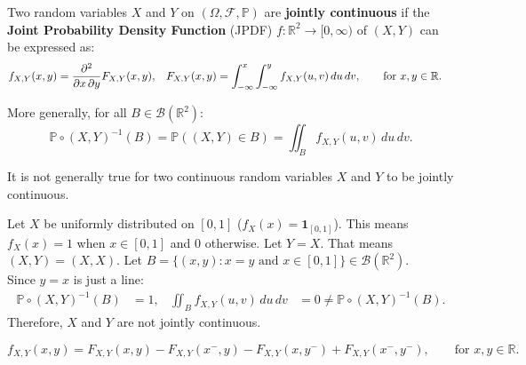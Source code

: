 \documentclass{huhtakm-template-book-v2}
\newcommand{\prob}{\mathbb{P}}
\begin{document}
    \begin{defn}
        Two random variables $X$ and $Y$ on $(\Omega,\mathcal{F},\prob)$ are \textbf{jointly continuous} if the \textbf{Joint Probability Density Function} (JPDF) $f: \mathbb{R}^{2} \to [0,\infty)$ of $(X,Y)$ can be expressed as:
        \begin{align*}
            f_{X,Y}(x, y) &= \pdv*{F_{X,Y}(x, y)}{x,y}, & F_{X,Y}(x, y) &= \int_{-\infty}^{x}\int_{-\infty}^{y}f_{X,Y}(u, v)\,du\,dv, \qquad\text{for }x,y \in \mathbb{R}.
        \end{align*}
    \end{defn}
    \begin{rem}
        More generally, for all $B \in \mathcal{B}(\mathbb{R}^{2})$:
        \begin{equation*}
            \prob \circ (X,Y)^{-1}(B) = \prob((X,Y) \in B) = \iint_{B}f_{X,Y}(u, v)\,du\,dv.
        \end{equation*}
    \end{rem}
    \begin{rem}
        It is not generally true for two continuous random variables $X$ and $Y$ to be jointly continuous.
    \end{rem}
    \begin{eg}
        Let $X$ be uniformly distributed on $[0,1]$ ($f_{X}(x) = \mathbf{1}_{[0,1]}$). This means $f_{X}(x) = 1$ when $x \in [0,1]$ and $0$ otherwise. Let $Y = X$. That means $(X,Y) = (X,X)$. Let $B = \{(x, y):x = y\text{ and }x \in [0,1]\} \in \mathcal{B}(\mathbb{R}^{2})$.\\
        Since $y = x$ is just a line:
        \begin{align*}
            \prob \circ (X,Y)^{-1}(B) &= 1, & \iint_{B}f_{X,Y}(u, v)\,du\,dv &= 0 \neq \prob \circ (X,Y)^{-1}(B).
        \end{align*}
        Therefore, $X$ and $Y$ are not jointly continuous.
    \end{eg}
    \begin{rem}
        \begin{equation*}
            f_{X,Y}(x, y) = F_{X,Y}(x, y)-F_{X,Y}(x^{-},y)-F_{X,Y}(x,y^{-})+F_{X,Y}(x^{-},y^{-}), \qquad\text{for } x,y \in \mathbb{R}.
        \end{equation*}
    \end{rem}
    \newpage
\end{document}
